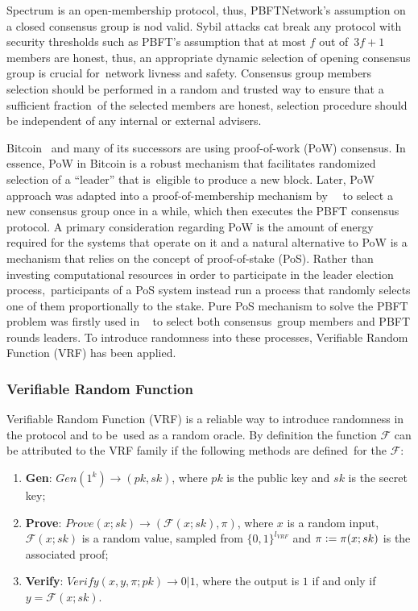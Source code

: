 Spectrum is an open-membership protocol, thus, PBFTNetwork's assumption on a closed consensus group is nod valid.
Sybil attacks cat break any protocol with security thresholds such as PBFT's assumption that at most $f$ out of\
${3 f + 1}$ members are honest, thus, an appropriate dynamic selection of opening consensus group is crucial for\
network livness and safety.
Consensus group members selection should be performed in a random and trusted way to ensure that a sufficient fraction\
of the selected members are honest, selection procedure should be independent of any internal or external advisers.

Bitcoin~\cite{nakamoto2009bitcoin} and many of its successors are using proof-of-work (PoW) consensus.
In essence, PoW in Bitcoin is a robust mechanism that facilitates randomized selection of a \enquote{leader} that is\
eligible to produce a new block.
Later, PoW approach was adapted into a proof-of-membership mechanism by ~\cite{kokoriskogias2016enhancing}\
to select a new consensus group once in a while, which then executes the PBFT consensus protocol.
A primary consideration regarding PoW is the amount of energy required for the systems that operate on it and
a natural alternative to PoW is a mechanism that relies on the concept of proof-of-stake (PoS).
Rather than investing computational resources in order to participate in the leader election process,\
participants of a PoS system instead run a process that randomly selects one of them proportionally to the stake.
Pure PoS mechanism to solve the PBFT problem was firstly used in ~\cite{cryptoeprint:2017/454} to select both consensus\
group members and PBFT rounds leaders.
To introduce randomness into these processes, Verifiable Random Function (VRF) has been applied.

\subsubsection{Verifiable Random Function}

Verifiable Random Function (VRF) is a reliable way to introduce randomness in the protocol and to be\
used as a random oracle.
By definition the function $\mathcal{F}$ can be attributed to the VRF family if the following methods are defined\
for the $\mathcal{F}$:
\begin{enumerate}
    \item \textbf{Gen}: ${Gen(1^k) \rightarrow (pk, sk)}$, where $pk$ is the public key and $sk$ is the secret key;
    \item \textbf{Prove}: ${Prove(x; sk) \rightarrow (\mathcal{F}(x; sk), \pi)}$, where $x$ is a random input, $\mathcal{F}(x; sk)$ is a random value, sampled from $\{0,1\}^{l_{VRF}}$ and $\pi \vcentcolon= \pi(x; sk)$ is the associated proof;
    \item \textbf{Verify}: ${Verify(x, y, \pi; pk) \rightarrow 0 | 1}$, where the output is $1$ if and only if ${y=\mathcal{F}(x; sk)}$.
\end{enumerate}

